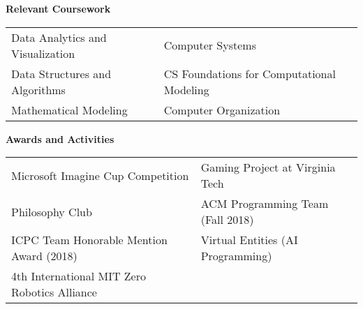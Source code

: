 \documentclass{article}
\begin{document}
\vline

\textbf{\large{Relevant Coursework}} 

\vspace{5pt}

\begin{tabular}{l l}
	Data Analytics and Visualization & Computer Systems \\
	Data Structures and Algorithms & CS Foundations for Computational Modeling \\
	Mathematical Modeling & Computer Organization
\end{tabular} 


\vline
\vspace{0.5cm}

\textbf{\large{Awards and Activities}}

\vspace{5pt}

\begin{tabular}{l l}
	Microsoft Imagine Cup Competition & Gaming Project at Virginia Tech \\
	Philosophy Club & ACM Programming Team (Fall 2018) \\
	ICPC Team Honorable Mention Award (2018) & Virtual Entities (AI Programming) \\
	4th International MIT Zero Robotics Alliance	
\end{tabular} 
\end{document}
